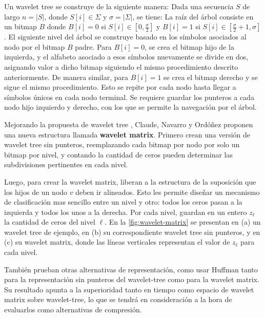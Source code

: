 

Un wavelet tree se construye de la siguiente manera: Dada una secuencia $S$ de largo $n = |S|$, donde $S[i] \in \Sigma$ y $\sigma = |\Sigma|$, se tiene: La raíz del árbol consiste en un bitmap $B$ donde $B[i] = 0$ si $S[i] \in [0, \frac{\sigma}{2}]$ y $B[i] = 1$ si $S[i] \in [\frac{\sigma}{2} + 1, \sigma]$. El siguiente nivel del árbol se construye basado en los símbolos asociados al nodo por el bitmap $B$ padre. Para $B[i] = 0$, se crea el bitmap hijo de la izquierda, y el alfabeto asociado a esos símbolos nuevamente se divide en dos, asignando valor a dicho bitmap siguiendo el mismo procedimiento descrito anteriormente. De manera similar, para $B[i] = 1$ se crea el bitmap derecho y se sigue el mismo procedimiento. Esto se repite por cada nodo hasta llegar a símbolos únicos en cada nodo terminal. Se requiere guardar los punteros a cada nodo hijo izquierdo y derecho, con los que se permite la navegación por el árbol.

Mejorando la propuesta de wavelet tree \cite{grossi2003high}, Claude, Navarro y Ordóñez \cite{claude2015wavelet} proponen una nueva estructura llamada \textbf{wavelet matrix}. Primero crean una versión de wavelet tree sin punteros, reemplazando cada bitmap por nodo por solo un bitmap por nivel, y contando la cantidad de ceros pueden determinar las subdivisiones pertinentes en cada nivel. 

Luego, para crear la wavelet matrix, liberan a la estructura de la suposición que los hijos de un nodo $v$ deben ir alineados. Esto les permite diseñar un mecanismo de clasificación mas sencillo entre un nivel y otro: todos los ceros pasan a la izquierda y todos los unos a la derecha. Por cada nivel, guardan en un entero $z_{\ell}$ la cantidad de ceros del nivel $\ell$. En la \autoref{fig:wavelet-matrix} se presentan en (a) un wavelet tree de ejemplo, en (b) su correspondiente wavelet tree sin punteros, y en (c) su wavelet matrix, donde las líneas verticales representan el valor de $z_{\ell}$ para cada nivel.



También prueban otras alternativas de representación, como usar Huffman \cite{huffman1952method} tanto para la representación sin punteros del wavelet-tree como para la wavelet matrix. Su resultado apunta a la superioridad tanto en tiempo como espacio de wavelet matrix sobre wavelet-tree, lo que se tendrá en consideración a la hora de evaluarlos como alternativas de compresión.


